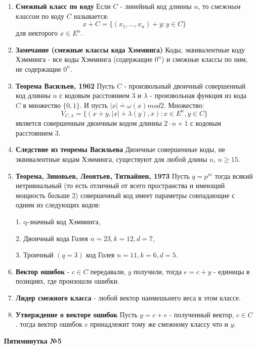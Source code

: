 \documentclass[a4paper, 12pt]{report}
\begin{document}
\begin{enumerate}
\item \textbf{Смежный класс по коду} Если $C$ - линейный код длинны $n$, то \textit{смежным классом} по коду $C$ называется: 
\[x + C = \lbrace (x_{1}, ..., x_{n}) + y : y\in C\rbrace\] 
для некторого $x \in E^{n}$.

\item \textbf{Замечание (смежные классы кода Хэмминга)} Коды, эквивалентные коду Хэмминга - все коды Хэмминга (содержащие $0^{n}$) и смежные классы по ним, не содержащие $0^{n}$. 

\item \textbf{Теорема Васильев, 1962} Пусть $C$ - произвольный двоичный совершенный код длинны $n$ с кодовым расстоянием $3$ и $\lambda$ - произвольная функция из кода $C$ в множество $\lbrace 0,1\rbrace$. И пусть $|x| \doteq \omega(x) mod 2$. Множество:
\[V_{C,\lambda} = \lbrace(x + y, |x| + \lambda(y), x): x\in E^{n}, y \in C\rbrace \]
является совершенным двоичным кодом длинны $2\cdot n + 1$ с кодовым расстоянием $3$.

\item \textbf{Следствие из теоремы Васильева} Двоичные совершенные коды, не эквивалентные кодам Хэмминга, существуют для любой длины $n$, $n\geq 15$.

\item \textbf{Теорема, Зиновьев, Леонтьев, Титвайнен, 1973}
Пусть $q = p^m$ тогда всякий  нетривиальный (то есть отличный от всего пространства и имеющий мощность больше 2) совершенный код имеет параметры совпадающие с одним из следующих кодов:

1. q-значный код Хэмминга,

2. Двоичный кода Голея $n = 23, k = 12, d = 7$,

3. Троичный $(q = 3)$ код Голея $n = 11, k = 6, d = 5$.

\item \textbf{Вектор ошибок} - $c\in C$ передавали, $y$ получили, тогда $e = c + y$ - единицы в позициях, где произошли ошибки. 

\item \textbf{Лидер смежного класса} - любой вектор наимешьнего веса в этом классе.

\item \textbf{Утверждение о векторе ошибок} Пусть $y = c + e$ - полученный вектор, $c\in C$. тогда вектор ошибок $e$ принадлежит тому же смежному классу что и $y$.

\end{enumerate}

\textbf{Пятиминутка №5}
\end{document}
